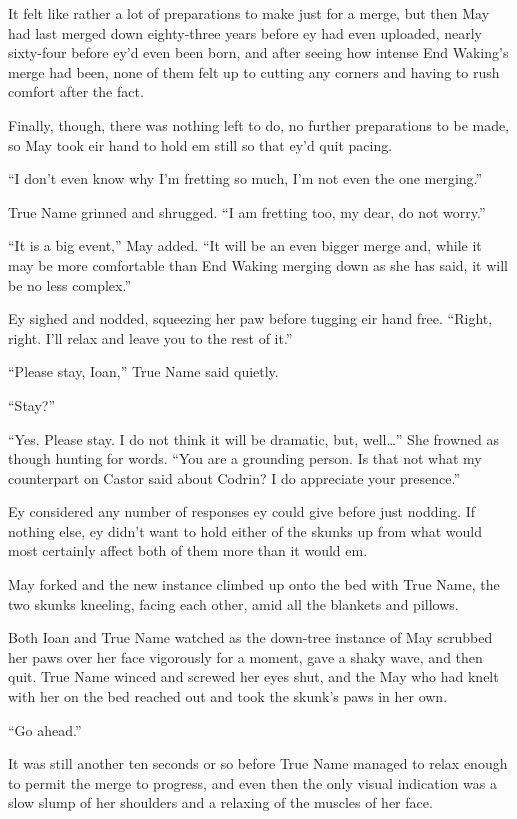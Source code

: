 It felt like rather a lot of preparations to make just for a merge, but then May had last merged down eighty-three years before ey had even uploaded, nearly sixty-four before ey'd even been born, and after seeing how intense End Waking's merge had been, none of them felt up to cutting any corners and having to rush comfort after the fact.

Finally, though, there was nothing left to do, no further preparations to be made, so May took eir hand to hold em still so that ey'd quit pacing.

``I don't even know why I'm fretting so much, I'm not even the one merging.''

True Name grinned and shrugged. ``I am fretting too, my dear, do not worry.''

``It is a big event,'' May added. ``It will be an even bigger merge and, while it may be more comfortable than End Waking merging down as she has said, it will be no less complex.''

Ey sighed and nodded, squeezing her paw before tugging eir hand free. ``Right, right. I'll relax and leave you to the rest of it.''

``Please stay, Ioan,'' True Name said quietly.

``Stay?''

``Yes. Please stay. I do not think it will be dramatic, but, well\ldots{}'' She frowned as though hunting for words. ``You are a grounding person. Is that not what my counterpart on Castor said about Codrin? I do appreciate your presence.''

Ey considered any number of responses ey could give before just nodding. If nothing else, ey didn't want to hold either of the skunks up from what would most certainly affect both of them more than it would em.

May forked and the new instance climbed up onto the bed with True Name, the two skunks kneeling, facing each other, amid all the blankets and pillows.

Both Ioan and True Name watched as the down-tree instance of May scrubbed her paws over her face vigorously for a moment, gave a shaky wave, and then quit. True Name winced and screwed her eyes shut, and the May who had knelt with her on the bed reached out and took the skunk's paws in her own.

``Go ahead.''

It was still another ten seconds or so before True Name managed to relax enough to permit the merge to progress, and even then the only visual indication was a slow slump of her shoulders and a relaxing of the muscles of her face.

